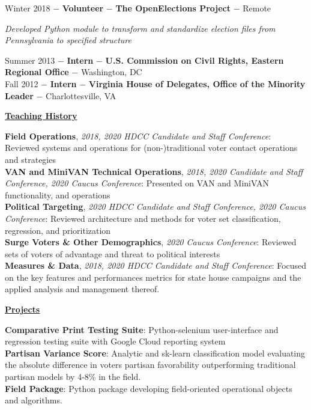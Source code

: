 \documentclass[8pt]{article}
\begin{document}
Winter 2018 $-$ \textbf{Volunteer} $-$ \textbf{The OpenElections Project} $-$ Remote
\begin{adjustwidth}{1cm}{1cm}
	\textit{Developed Python module to transform and standardize election files from Pennsylvania to specified structure} \\
\end{adjustwidth}

Summer 2013 $-$ \textbf{Intern} $-$ \textbf{U.S. Commission on Civil Rights, Eastern Regional Office} $-$ Washington, DC\\

Fall 2012 $-$  \textbf{Intern} $-$ \textbf{Virginia House of Delegates, Office of the Minority Leader} $-$ Charlottesville, VA \\[2.5pt]


\begin{center}
	\textbf{\underline{\Large{Teaching History}}}
\end{center}
\textbf{Field Operations}, \textit{2018, 2020 HDCC Candidate and Staff Conference}: Reviewed systems and operations for (non-)traditional voter contact operations and strategies \\
\textbf{VAN and MiniVAN Technical Operations}, \textit{2018, 2020 Candidate and Staff Conference, 2020 Caucus Conference}: Presented on VAN and MiniVAN functionality, and operations \\
\textbf{Political Targeting}, \textit{2020 HDCC Candidate and Staff Conference, 2020 Caucus Conference}: Reviewed architecture and methods for voter set classification, regression, and prioritization \\
\textbf{Surge Voters \& Other Demographics}, \textit{2020 Caucus Conference}: Reviewed sets of voters of advantage and threat to political interests \\
\textbf{Measures \& Data}, \textit{2018, 2020 HDCC Candidate and Staff Conference}: Focused on the key features and performances metrics for state house campaigns and the applied analysis and management thereof.  \\

\begin{center}
	\textbf{\underline{\Large{Projects}}}
\end{center}

\textbf{Comparative Print Testing Suite}: Python-selenium user-interface and regression testing suite with Google Cloud reporting system \\
\textbf{Partisan Variance Score}: Analytic and sk-learn classification model evaluating the absolute difference in voters partisan favorability outperforming traditional partisan models by 4-8\% in the field. \\[0pt]
\textbf{Field Package}: Python package developing field-oriented operational objects and algorithms. \\[2.5pt]
\end{document}
